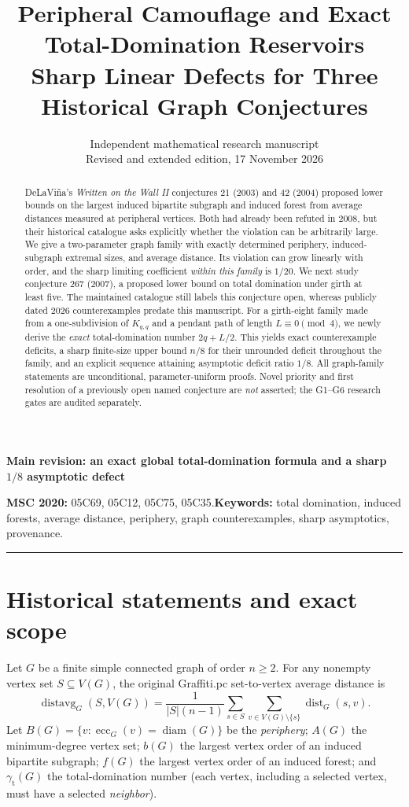\documentclass[11pt,a4paper]{article}
\title{\color{ink}\sffamily\bfseries Peripheral Camouflage and Exact Total-Domination Reservoirs\\[5pt]
\large Sharp Linear Defects for Three Historical Graph Conjectures}
\author{Independent mathematical research manuscript\\\small Revised and extended edition, 17 November 2026}
\date{}
\theoremstyle{definition}
\theoremstyle{remark}
\newcommand{\dist}{\operatorname{dist}}
\newcommand{\avg}{\operatorname{distavg}}
\newcommand{\ecc}{\operatorname{ecc}}
\newcommand{\diam}{\operatorname{diam}}
\newcommand{\gam}{\gamma_{\mathrm t}}
\begin{document}
\maketitle
\vspace{-1.2em}
\begin{center}\small\color{highlight}\textbf{Main revision: an exact global total-domination formula and a sharp $1/8$ asymptotic defect}\end{center}
\begin{abstract}
DeLaVi\~na's \emph{Written on the Wall II} conjectures 21 (2003) and 42 (2004) proposed lower bounds on the largest induced bipartite subgraph and induced forest from average distances measured at peripheral vertices. Both had already been refuted in 2008, but their historical catalogue asks explicitly whether the violation can be arbitrarily large. We give a two-parameter graph family with exactly determined periphery, induced-subgraph extremal sizes, and average distance. Its violation can grow linearly with order, and the sharp limiting coefficient \emph{within this family} is $1/20$. We next study conjecture 267 (2007), a proposed lower bound on total domination under girth at least five. The maintained catalogue still labels this conjecture open, whereas publicly dated 2026 counterexamples predate this manuscript. For a girth-eight family made from a one-subdivision of $K_{q,q}$ and a pendant path of length $L\equiv0\pmod4$, we newly derive the \emph{exact} total-domination number $2q+L/2$. This yields exact counterexample deficits, a sharp finite-size upper bound $n/8$ for their unrounded deficit throughout the family, and an explicit sequence attaining asymptotic deficit ratio $1/8$. All graph-family statements are unconditional, parameter-uniform proofs. Novel priority and first resolution of a previously open named conjecture are \emph{not} asserted; the G1--G6 research gates are audited separately.
\end{abstract}
\noindent\textbf{MSC 2020:} 05C69, 05C12, 05C75, 05C35.\quad\textbf{Keywords:} total domination, induced forests, average distance, periphery, graph counterexamples, sharp asymptotics, provenance.
\medskip\hrule\medskip
\section{Historical statements and exact scope}
Let $G$ be a finite simple connected graph of order $n\ge2$. For any nonempty vertex set $S\subseteq V(G)$, the original Graffiti.pc set-to-vertex average distance is
\begin{equation}\label{eq:avg-def}
\avg_G(S,V(G))=\frac{1}{|S|(n-1)}\sum_{s\in S}\sum_{v\in V(G)\setminus\{s\}}\dist_G(s,v).
\end{equation}
Let $B(G)=\{v:\ecc_G(v)=\diam(G)\}$ be the \emph{periphery}; $A(G)$ the minimum-degree vertex set; $b(G)$ the largest vertex order of an induced bipartite subgraph; $f(G)$ the largest vertex order of an induced forest; and $\gam(G)$ the total-domination number (each vertex, including a selected vertex, must have a selected \emph{neighbor}).
\end{document}
